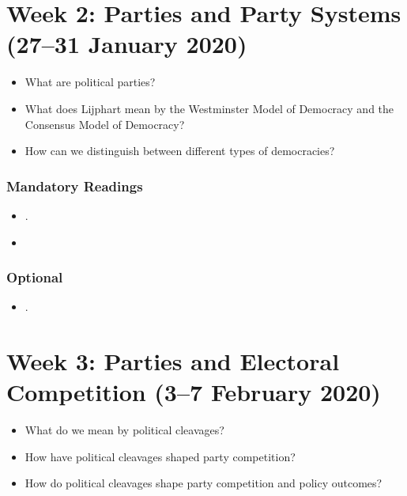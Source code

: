 \documentclass[abstract=on,parskip=full,headings=standardclasses,fontsize=11pt,paper=a4]{scrartcl}
\begin{document}
\section{Week 2: Parties and Party Systems (27--31 January 2020)}

\begin{itemize}
\renewcommand\labelitemi{--}
\item  What are political parties?
\item What does Lijphart mean by the Westminster Model of Democracy and the Consensus Model of Democracy?
\item How can we distinguish between different types of democracies?
\end{itemize}

\subsubsection*{Mandatory Readings}
\begin{itemize}
\item {}.
\item {}
\end{itemize}



\subsubsection*{Optional}
\begin{itemize}
\item {}.
\end{itemize}



\section{Week 3: Parties and Electoral Competition (3--7 February 2020)}

\begin{itemize}
\renewcommand\labelitemi{--}
\item  What do we mean by political cleavages?
\item How have political cleavages shaped party competition? 
\item How do political cleavages shape party competition and policy outcomes?
\end{itemize}
\end{document}
